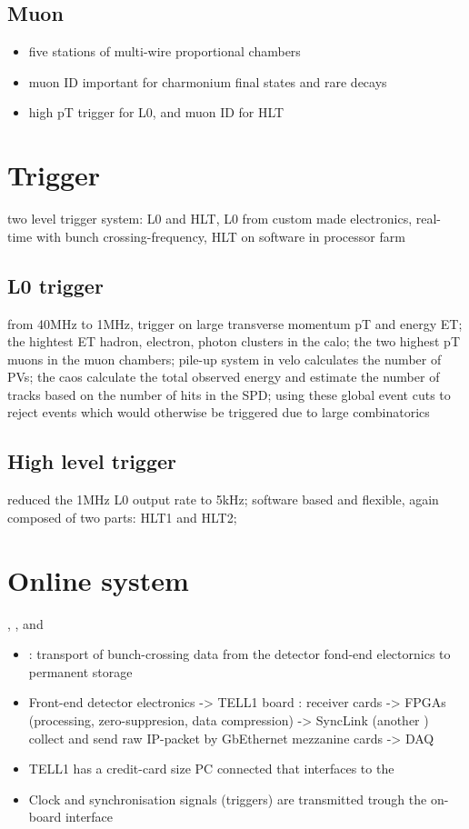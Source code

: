 \subsection{Muon}
\begin{itemize}
  \item five stations of multi-wire proportional chambers
  \item muon ID important for charmonium final states and rare decays
  \item high pT trigger for L0, and muon ID for HLT
\end{itemize}
\section{Trigger}
two level trigger system: L0 and HLT, L0 from custom made electronics, real-time with bunch crossing-frequency, HLT on software in processor farm
\subsection{L0 trigger}
from 40MHz to 1MHz, trigger on large transverse momentum pT and energy ET; the hightest ET hadron, electron, photon clusters in the calo; the two highest pT muons in the muon chambers; pile-up system in velo calculates the number of PVs; the caos calculate the total observed energy and estimate the number of tracks based on the number of hits in the SPD; using these global event cuts to reject events which would otherwise be triggered due to large combinatorics
\subsection{High level trigger}
reduced the 1MHz L0 output rate to 5kHz; software based and flexible, again composed of two parts: HLT1 and HLT2; 
\section{Online system}
\DAQ, \TFC, and \ECS
\begin{itemize}
  \item \DAQ: transport of bunch-crossing data from the detector fond-end electornics to permanent storage
  \item Front-end detector electronics -> TELL1 board : receiver cards -> \acp{FPGA} (processing, zero-suppresion, data compression) -> SyncLink (another \FPGA) collect and send raw IP-packet by GbEthernet mezzanine cards -> DAQ
  \item TELL1 has a credit-card size PC connected that interfaces to the \ECS
  \item Clock and synchronisation signals (\eg triggers) are transmitted trough the on-board \TTC interface
\end{itemize}
